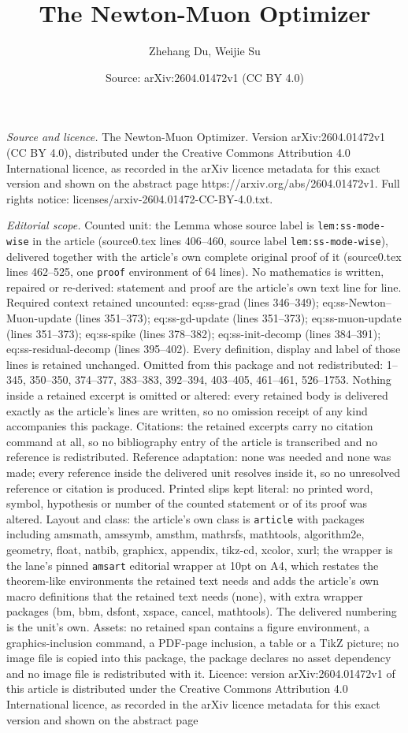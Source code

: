 \documentclass[10pt,a4paper]{amsart}
\title[The Newton-Muon Optimizer]{The Newton-Muon Optimizer}
\author{Zhehang Du, Weijie Su}
\date{Source: arXiv:2604.01472v1 (CC BY 4.0)}
\begin{document}
\maketitle

\noindent\emph{Source and licence.} The Newton-Muon Optimizer. Version arXiv:2604.01472v1 (CC BY 4.0), distributed under the Creative Commons Attribution 4.0 International licence, as recorded in the arXiv licence metadata for this exact version and shown on the abstract page https://arxiv.org/abs/2604.01472v1. Full rights notice: licenses/arxiv-2604.01472-CC-BY-4.0.txt.\par\smallskip

\noindent\textit{Editorial scope.} Counted unit: the Lemma whose source label is \texttt{lem:ss-mode-wise} in the article (source0.tex lines 406--460, source label \texttt{lem:ss-mode-wise}), delivered together with the article's own complete original proof of it (source0.tex lines 462--525, one \texttt{proof} environment of 64 lines). No mathematics is written, repaired or re-derived: statement and proof are the article's own text line for line. Required context retained uncounted: eq:ss-grad (lines 346--349); eq:ss-Newton--Muon-update (lines 351--373); eq:ss-gd-update (lines 351--373); eq:ss-muon-update (lines 351--373); eq:ss-spike (lines 378--382); eq:ss-init-decomp (lines 384--391); eq:ss-residual-decomp (lines 395--402). Every definition, display and label of those lines is retained unchanged. Omitted from this package and not redistributed: 1--345, 350--350, 374--377, 383--383, 392--394, 403--405, 461--461, 526--1753. Nothing inside a retained excerpt is omitted or altered: every retained body is delivered exactly as the article's lines are written, so no omission receipt of any kind accompanies this package. Citations: the retained excerpts carry no citation command at all, so no bibliography entry of the article is transcribed and no reference is redistributed. Reference adaptation: none was needed and none was made; every reference inside the delivered unit resolves inside it, so no unresolved reference or citation is produced. Printed slips kept literal: no printed word, symbol, hypothesis or number of the counted statement or of its proof was altered. Layout and class: the article's own class is \texttt{article} with packages including amsmath, amssymb, amsthm, mathrsfs, mathtools, algorithm2e, geometry, float, natbib, graphicx, appendix, tikz-cd, xcolor, xurl; the wrapper is the lane's pinned \texttt{amsart} editorial wrapper at 10pt on A4, which restates the theorem-like environments the retained text needs and adds the article's own macro definitions that the retained text needs (none), with extra wrapper packages (bm, bbm, dsfont, xspace, cancel, mathtools). The delivered numbering is the unit's own. Assets: no retained span contains a figure environment, a graphics-inclusion command, a PDF-page inclusion, a table or a TikZ picture; no image file is copied into this package, the package declares no asset dependency and no image file is redistributed with it. Licence: version arXiv:2604.01472v1 of this article is distributed under the Creative Commons Attribution 4.0 International licence, as recorded in the arXiv licence metadata for this exact version and shown on the abstract page 
\end{document}
